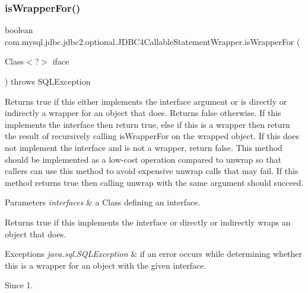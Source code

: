 \subsubsection{\texorpdfstring{is\+Wrapper\+For()}{isWrapperFor()}}
{\footnotesize\ttfamily boolean com.\+mysql.\+jdbc.\+jdbc2.\+optional.\+J\+D\+B\+C4\+Callable\+Statement\+Wrapper.\+is\+Wrapper\+For (\begin{DoxyParamCaption}\item[{Class$<$?$>$}]{iface }\end{DoxyParamCaption}) throws S\+Q\+L\+Exception}

Returns true if this either implements the interface argument or is directly or indirectly a wrapper for an object that does. Returns false otherwise. If this implements the interface then return true, else if this is a wrapper then return the result of recursively calling {\ttfamily is\+Wrapper\+For} on the wrapped object. If this does not implement the interface and is not a wrapper, return false. This method should be implemented as a low-\/cost operation compared to {\ttfamily unwrap} so that callers can use this method to avoid expensive {\ttfamily unwrap} calls that may fail. If this method returns true then calling {\ttfamily unwrap} with the same argument should succeed.


\begin{DoxyParams}{Parameters}
{\em interfaces} & a Class defining an interface. \\
\hline
\end{DoxyParams}
\begin{DoxyReturn}{Returns}
true if this implements the interface or directly or indirectly wraps an object that does. 
\end{DoxyReturn}

\begin{DoxyExceptions}{Exceptions}
{\em java.\+sql.\+S\+Q\+L\+Exception} & if an error occurs while determining whether this is a wrapper for an object with the given interface. \\
\hline
\end{DoxyExceptions}
\begin{DoxySince}{Since}
1. 
\end{DoxySince}
\mbox{\label{classcom_1_1mysql_1_1jdbc_1_1jdbc2_1_1optional_1_1_j_d_b_c4_callable_statement_wrapper_a7538139197ca44db6cc1f29a517207bb}} 
